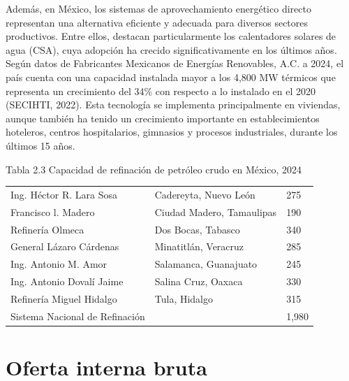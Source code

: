 \documentclass{sener2025}
\begin{document}
Además, en México, los sistemas de aprovechamiento energético directo representan una alternativa eficiente y adecuada para diversos sectores productivos. Entre ellos, destacan particularmente los calentadores solares de agua (CSA), cuya adopción ha crecido significativamente en los últimos años. Según datos de Fabricantes Mexicanos de Energías Renovables, A.C. a 2024, el país cuenta con una capacidad instalada mayor a los 4,800 MW térmicos que representa un crecimiento del 34\% con respecto a lo instalado en el 2020 (SECIHTI, 2022). Esta tecnología se implementa principalmente en viviendas, aunque también ha tenido un crecimiento importante en establecimientos hoteleros, centros hospitalarios, gimnasios y procesos industriales, durante los últimos 15 años.
\begin{tabladoradoCorto}
  \caption{Tabla 2.3 Capacidad de refinación de petróleo crudo en México, 2024}
  \label{tab:tabla_2_3_capacidad_de_refinac}
  \begin{tabularx}{\textwidth}{Vvv}
    \toprule
      &  &  \\
    \midrule
    Ing. Héctor R. Lara Sosa & Cadereyta, Nuevo León & 275 \\
    Francisco l. Madero & Ciudad Madero, Tamaulipas & 190 \\
    Refinería Olmeca & Dos Bocas, Tabasco & 340 \\
    General Lázaro Cárdenas & Minatitlán, Veracruz & 285 \\
    Ing. Antonio M. Amor & Salamanca, Guanajuato & 245 \\
    Ing. Antonio Dovalí Jaime & Salina Cruz, Oaxaca & 330 \\
    Refinería Miguel Hidalgo & Tula, Hidalgo & 315 \\
    Sistema Nacional de Refinación &  & 1,980 \\
    \bottomrule
  \end{tabularx}
\end{tabladoradoCorto}
\vspace{-4pt}




\section{Oferta interna bruta}
\end{document}
